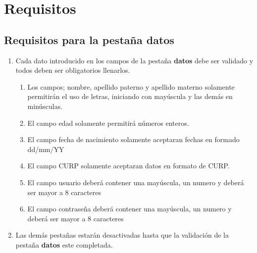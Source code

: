 	\section{Requisitos}
		\subsection{Requisitos para la pestaña datos}
		\begin{enumerate}
			\item Cada dato introducido en los campos de la pestaña \textbf{datos} debe ser validado y todos deben ser obligatorios llenarlos.
				\begin{enumerate}[a]
					\item Los campos; nombre, apellido paterno y apellido materno solamente permitirán el uso de letras, iniciando con mayúscula y las demás en minúsculas.
					\item El campo edad solamente permitirá números enteros.
					\item El campo fecha de nacimiento solamente aceptaran fechas en formado dd/mm/YY
					\item El campo CURP solamente aceptaran datos en formato de CURP.
					\item El campo usuario deberá contener una mayúscula, un numero y deberá ser mayor a 8 caracteres
					\item El campo contraseña deberá contener una mayúscula, un numero y deberá ser mayor a 8 caracteres
				\end{enumerate}
			\item Las demás pestañas estarán desactivadas hasta que la validación de la pestaña \textbf{datos} este completada.
			
		\end{enumerate}
		
